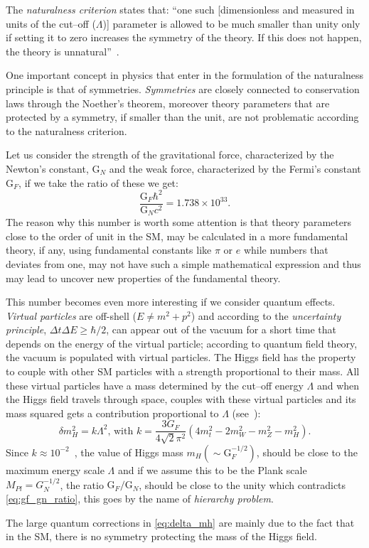 The \emph{naturalness criterion} states that: ``one such [dimensionless and
measured in units of the cut--off ($\Lambda$)] parameter is allowed to be much
smaller than unity only if setting it to zero increases the symmetry of the
theory. If this does not happen, the theory is unnatural''~\cite{thooft:gauge}.

One important concept in physics that enter in the formulation of the
naturalness principle is that of symmetries. \emph{Symmetries} are closely
connected to conservation laws through the Noether's theorem, moreover theory
parameters that are protected by a symmetry, if smaller than the unit, are not
problematic according to the naturalness criterion.

Let us consider the strength of the gravitational force, characterized by the
Newton's constant, G$_N$ and the weak force, characterized by the Fermi's
constant G$_F$, if we take the ratio of these we get:
\begin{equation}
  \label{eq:gf_gn_ratio}
  \frac{\mathrm{G}_F \hbar^2}{\mathrm{G}_N c^2} = 1.738 \times 10^{33}.
\end{equation}
The reason why this number is worth some attention is that theory parameters
close to the order of unit in the SM, may be calculated in a more fundamental
theory, if any, using fundamental constants like $\pi$ or $e$ while numbers that
deviates from one, may not have such a simple mathematical expression and thus
may lead to uncover new properties of the fundamental theory.

This number becomes even more interesting if we consider quantum effects.
\emph{Virtual particles} are off-shell ($E \neq m^2 + p^2$) and according to the
\emph{uncertainty principle}, $\Delta t \Delta E \geq \hbar / 2$, can appear out
of the vacuum for a short time that depends on the energy of the virtual
particle; according to quantum field theory, the vacuum is populated with
virtual particles. The Higgs field has the property to couple with other SM
particles with a strength proportional to their mass. All these virtual
particles have a mass determined by the cut--off energy $\Lambda$ and when the
Higgs field travels through space, couples with these virtual particles and its
mass squared gets a contribution proportional to $\Lambda$
(see~\cite{Giudice:2008bi}):
\begin{equation}
  \label{eq:delta_mh}
  \delta m_H^2 = k \Lambda^2 \text{, with } k = \frac{3 G_F}{4 \sqrt{2}
    \pi^2}(4m_t^2 - 2m_W^2 - m_Z^2 - m_H^2).
\end{equation}
Since $k \approx 10^{-2}$~\cite{Giudice:2008bi}, the value of Higgs mass
$m_H (\sim \mathrm{G}_F^{-1/2})$, should be close to the maximum energy scale
$\Lambda$ and if we assume this to be the Plank scale $M_{Pl} = G_N^{-1/2}$, the
ratio $\mathrm{G}_F/\mathrm{G}_N$, should be close to the unity which
contradicts \cref{eq:gf_gn_ratio}, this goes by the name of \emph{hierarchy
  problem}.

The large quantum corrections in \cref{eq:delta_mh} are mainly due to the fact
that in the SM, there is no symmetry protecting the mass of the Higgs field.
